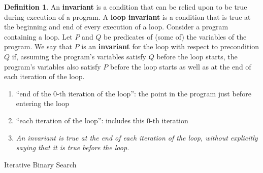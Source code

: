\documentclass[11pt]{article}
\theoremstyle{plain}%
\theoremstyle{definition}
\newtheorem{defn}{Definition}
\theoremstyle{remark}
\begin{document}
\begin{defn}
  \label{loop invariant}
  An \textbf{invariant} is a condition that can be relied upon to be true during execution of a program. A \textbf{loop invariant} is a condition that is true at the beginning and end of every execution of a loop. Consider a program containing a loop. Let $P$ and $Q$ be predicates of (some of) the variables of the program. We say that $P$ is an \textbf{invariant} for the loop with respect to precondition $Q$ if, assuming the program’s variables satisfy $Q$ before the loop starts, the program’s variables also satisfy $P$ before the loop starts as well as at the end of each iteration of the loop. \\

  \begin{enumerate}
    \item “end of the 0-th iteration of the loop”: the point in the program just before entering the loop
    \item “each iteration of the loop”: includes this 0-th iteration
    \item \textit{An invariant is true at the end of each iteration of the loop, without explicitly saying that it is true before the loop.}
  \end{enumerate}
\end{defn}


\begin{algorithm}[H]
    \label{IterativeBinSearch Algorithm}
    \caption{Iterative Binary Search}
    \DontPrintSemicolon


\end{algorithm}
\end{document}
